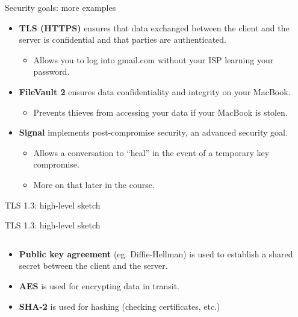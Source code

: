 \documentclass[aspectratio=169, lualatex, handout]{beamer}
\begin{document}
\begin{frame}{Security goals: more examples}
	\begin{itemize}[<+->]
		\item \textbf{TLS (HTTPS)} ensures that data exchanged between the client
		      and the server is confidential and that parties are authenticated.
		      \begin{itemize}
			      \item Allows you to log into gmail.com without your ISP learning your password.
		      \end{itemize}
		\item \textbf{FileVault 2} ensures data confidentiality and integrity on
		      your MacBook.
		      \begin{itemize}
			      \item Prevents thieves from accessing your data if your MacBook is stolen.
		      \end{itemize}
		\item \textbf{Signal} implements post-compromise security, an advanced security
		      goal.
		      \begin{itemize}
			      \item Allows a conversation to ``heal'' in the event of a temporary key
			            compromise.

			      \item More on that later in the course.
		      \end{itemize}
	\end{itemize}
\end{frame}

\begin{frame}{TLS 1.3: high-level sketch}
\end{frame}

\begin{frame}{TLS 1.3: high-level sketch}
	\begin{columns}[c]
		\begin{column}{0.5\textwidth}
			\begin{itemize}[<+->]
				\item \textbf{Public key agreement} (eg. Diffie-Hellman) is used to establish
				      a shared secret between the client and the server.
				\item \textbf{AES} is used for encrypting data in transit.
				\item \textbf{SHA-2} is used for hashing (checking certificates, etc.)
			\end{itemize}
		\end{column}

		\begin{column}{0.5\textwidth}
		\end{column}
	\end{columns}
\end{frame}
\end{document}
